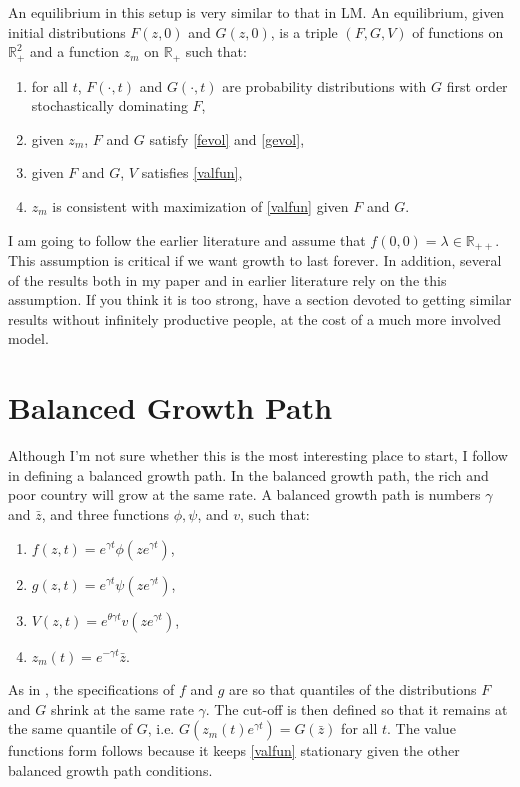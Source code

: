 \documentclass[12pt]{article}
\begin{document}
An equilibrium in this setup is very similar to that in LM.  
An equilibrium, given initial distributions $F(z,0)$ and $G(z,0)$, is a triple $(F,G,V)$ of functions on $\mathbb{R}_+^2$ and a function $z_m$ on $\mathbb{R}_+$ such that:
\begin{enumerate}
  \item for all $t$, $F(\cdot,t)$ and $G(\cdot,t)$ are probability distributions with $G$ first order stochastically dominating $F$, 
  \item given $z_m$, $F$ and $G$ satisfy \eqref{fevol} and \eqref{gevol},
  \item given $F$ and $G$, $V$ satisfies \eqref{valfun},
  \item $z_m$ is consistent with maximization of \eqref{valfun} given $F$ and $G$. 
\end{enumerate}

I am going to follow the earlier literature and assume that $f(0,0) = \lambda \in \mathbb{R}_{++}$.  This assumption is critical if we want growth to last forever.  In addition, several of the results both in my paper and in earlier literature rely on the this assumption.  If you think it is too strong, \citet{LucasMoll2012} have a section devoted to getting similar results without infinitely productive people, at the cost of a much more involved model.

\section{Balanced Growth Path}
Although I'm not sure whether this is the most interesting place to start, I follow \citet{LucasMoll2012} in defining a balanced growth path.
In the balanced growth path, the rich and poor country will grow at the same rate.
A balanced growth path is  numbers $\gamma$ and $\bar{z}$, and three functions $\phi,\psi$, and $v$, such that:
\begin{enumerate}
  \item $f(z,t) = e^{\gamma t} \phi(z e^{\gamma t})$,
  \item $g(z,t) = e^{\gamma t} \psi(z e^{\gamma t})$,
  \item $V(z,t) = e^{\theta \gamma t} v(ze^{\gamma t})$,
  \item $z_m(t) = e^{-\gamma t} \bar{z}$.
\end{enumerate}
As in \citet{LucasMoll2012}, the specifications of $f$ and $g$ are so that quantiles of the distributions $F$ and $G$ shrink at the same rate $\gamma$.
The cut-off is then defined so that it remains at the same quantile of $G$, i.e. $G(z_m(t) e^{\gamma t}) = G(\bar{z})$ for all $t$.
The value functions form follows because it keeps \eqref{valfun} stationary given the other balanced growth path conditions.
\end{document}
